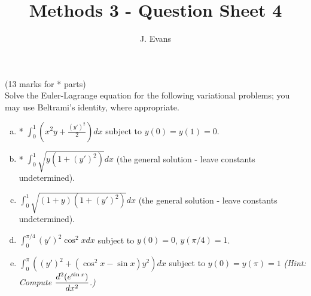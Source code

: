 \documentclass[12pt]{article}
\title{Methods 3 - Question Sheet 4}
\author{J. Evans}
\date{}
\begin{document}
\maketitle

\begin{question}(13 marks for * parts)\\
Solve the Euler-Lagrange equation for the following variational problems; you may use Beltrami's identity, where appropriate.
\begin{enumerate}[(a)]
\item * $\int_0^1\left(x^2y+\frac{(y')^2}{2}\right)dx$ subject to $y(0)=y(1)=0$.
\item * $\int_0^1\sqrt{y(1+(y')^2)}dx$ (the general solution - leave constants undetermined).
\item $\int_0^1\sqrt{(1+y)(1+(y')^2)}dx$ (the general solution - leave constants undetermined).
\item $\int_0^{\pi/4}(y')^2\cos^2 x dx$ subject to $y(0)=0$, $y(\pi/4)=1$.
\item $\int_0^{\pi}\left((y')^2+(\cos^2x-\sin x)y^2\right)dx$ subject to $y(0)=y(\pi)=1$ {\em (Hint: Compute $\dfrac{d^2 (e^{\sin x})}{d x^2}$.)}
\end{enumerate}
\end{question}
\end{document}
